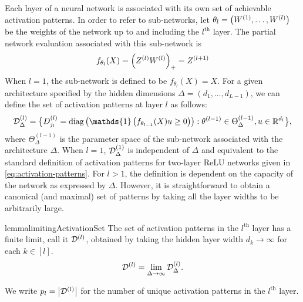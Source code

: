 Each layer of a neural network is associated with its own set of achievable
activation patterns.
In order to refer to sub-networks,
let \( \theta_l = \left(W^{(1)}, \ldots, W^{(l)}\right) \) be the weights of the
network up to and including the \( l^{\text{th}} \) layer.
The partial network evaluation associated with this sub-network is
\begin{equation}\label{eq:sub-network}
    f_{\theta_{l}}(X) = \left(Z^{(l)} W^{(l)}\right)_+ = Z^{(l+1)}
\end{equation}
When \( l = 1 \), the sub-network is defined to be \( f_{\theta_{l}}(X) = X \).
For a given architecture specified by the hidden dimensions
\( \Delta = (d_1, \ldots, d_{L-1}) \), we can define the set of activation
patterns at layer \( l \) as follows:
\begin{equation}\label{eq:l-activation-patterns}
    \begin{aligned}
        \calDl_{\Delta} = \big\{
        \Dl_{j_l} =
        \diag\rbr{\mathds{1}\rbr{f_{\theta_{l-1}}(X) u \geq 0}}
        : \theta^{(l-1)} \in \Theta_\Delta^{(l-1)}, u \in \R^{d_{l}}
        \big\},
    \end{aligned}
\end{equation}
where \( \Theta^{(l-1)}_{\Delta} \) is the parameter space of the sub-network
associated with the architecture \( \Delta \).
When \( l = 1 \), \( \mathcal{D}^{(1)}_{\Delta} \) is independent of \( \Delta \)
and equivalent to the standard definition of activation patterns for two-layer
ReLU networks given in \cref{eq:activation-patterns}.
For \( l > 1 \), the definition is dependent on the capacity of the network
as expressed by \( \Delta \).
However, it is straightforward to obtain a canonical (and maximal) set of
patterns by taking all the layer widths to be arbitrarily large.
\begin{restatable}{lemma}{limitingActivationSet}\label{lemma:activation-patterns}
    The set of activation patterns in the \( l^{\text{th}} \) layer has a
    finite limit, call it \( \mathcal{D}^{(l)} \), obtained by taking the hidden layer
    width \( d_{k} \rightarrow \infty \) for each \( k \in [l] \).
    \begin{equation}\label{eq:limiting-activation-set}
        \mathcal{D}^{(l)} = \lim_{\Delta \rightarrow \infty} \mathcal{D}^{(l)}_{\Delta}.
    \end{equation}
\end{restatable}
We write \( p_{l} = \left\vert \mathcal{D}^{(l)}\right\vert \) for the number of unique activation
patterns in the \( l^{\text{th}} \) layer.

